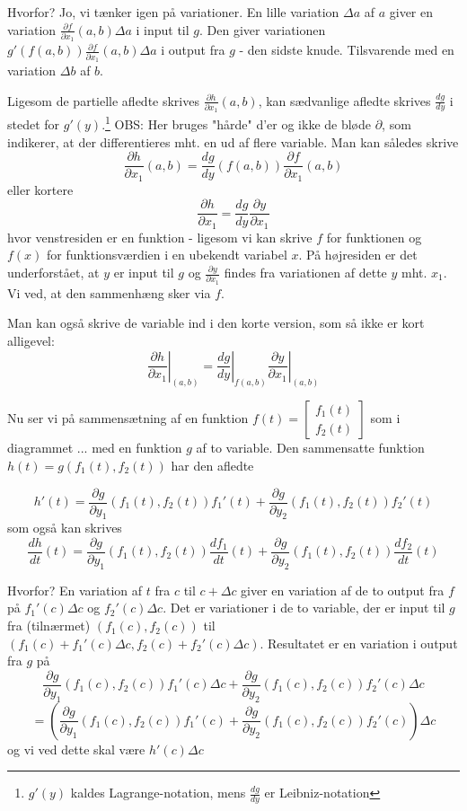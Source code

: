\documentclass[a4paper, 12pt]{article}
\theoremstyle{remark}
\begin{document}
Hvorfor? Jo, vi tænker igen på variationer. En lille variation $\Delta a$ af $a$ giver en variation $\frac{\partial f}{\partial x_1}(a,b)\Delta a$ i input til $g$. Den giver variationen $g'(f(a,b))\frac{\partial f}{\partial x_1}(a,b)\Delta a$ i output fra $g$ - den sidste knude. Tilsvarende med en variation $\Delta b$ af $b$.

\begin{tcolorbox}
Ligesom de partielle afledte skrives $\frac{\partial h}{\partial x_1}(a,b)$, kan sædvanlige afledte skrives $\frac{dg}{dy}$ i stedet for $g'(y)$.\footnote{$g'(y)$ kaldes Lagrange-notation, mens $\frac{dg}{dy}$ er Leibniz-notation} OBS: Her bruges "hårde" d'er og ikke de bløde $\partial$, som indikerer, at der differentieres mht. en ud af flere variable. Man kan således skrive 
 $$\frac{\partial h}{\partial x_1}(a,b)=\frac{dg}{dy}(f(a,b))\frac{\partial f}{\partial x_1}(a,b)$$
eller kortere 
$$\frac{\partial h}{\partial x_1}=\frac{dg}{dy}\frac{\partial y}{\partial x_1}$$
hvor venstresiden er en funktion - ligesom vi kan skrive $f$ for funktionen og $f(x)$ for funktionsværdien i en ubekendt variabel $x$. På højresiden er det underforstået, at $y$ er input til $g$ og $\frac{\partial y}{\partial x_1}$ findes fra variationen af dette $y$ mht. $x_1$. Vi ved, at den sammenhæng sker via $f$.


Man kan også skrive de variable ind i den korte version, som så ikke er kort alligevel:
$$\left.\frac{\partial h}{\partial x_1}\right\vert_{(a,b)}=\left.\frac{dg}{dy}\right\vert_{f(a,b)}\left.\frac{\partial y}{\partial x_1}\right\vert_{(a,b)}$$
\end{tcolorbox}

Nu ser vi på sammensætning af en funktion $f(t)=\begin{bmatrix}f_1(t)\\f_2(t)\end{bmatrix}$ som i diagrammet ... med en funktion $g$ af to variable. Den sammensatte funktion $h(t)=g(f_1(t),f_2(t))$ har den afledte

$$h'(t)=\frac{\partial g}{\partial y_1}(f_1(t),f_2(t))f_1'(t)+\frac{\partial g}{\partial y_2}(f_1(t),f_2(t))f_2'(t)$$
som også kan skrives 
$$\frac{dh}{dt}(t)=\frac{\partial g}{\partial y_1}(f_1(t),f_2(t))\frac{df_1}{dt}(t)+\frac{\partial g}{\partial y_2}(f_1(t),f_2(t))\frac{df_2}{dt}(t)$$


Hvorfor? En variation af $t$ fra $c$ til $c+\Delta c$ giver en variation af de to output fra $f$ på $f_1'(c)\Delta c$ og $f_2'(c)\Delta c$. Det er variationer i de to variable, der er input til $g$ fra (tilnærmet) $(f_1(c),f_2(c))$ til $(f_1(c)+f_1'(c)\Delta c,f_2(c)+f_2'(c)\Delta c)$. Resultatet er en variation i output fra $g$ på $$\frac{\partial g}{\partial y_1}(f_1(c),f_2(c))f_1'(c)\Delta c+\frac{\partial g}{\partial y_2}(f_1(c),f_2(c))f_2'(c)\Delta c $$ $$=(\frac{\partial g}{\partial y_1}(f_1(c),f_2(c))f_1'(c)+\frac{\partial g}{\partial y_2}(f_1(c),f_2(c))f_2'(c))\Delta c$$ og vi ved dette skal være $h'(c)\Delta c$
\end{document}
